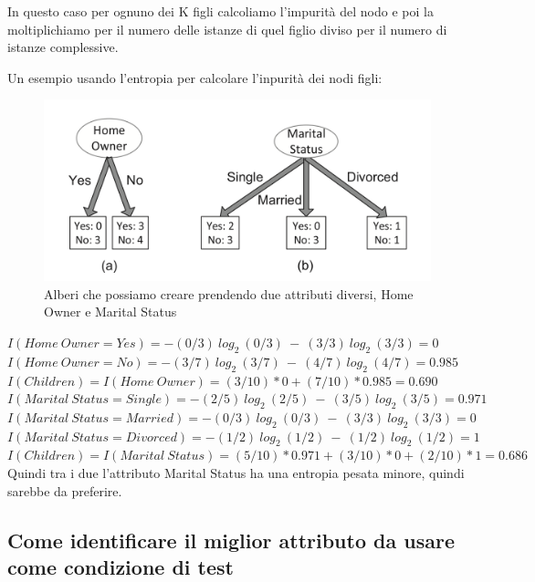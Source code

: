 \documentclass[14pt]{extreport}
\begin{document}
In questo caso per ognuno dei K figli calcoliamo l'impurità del nodo e poi la moltiplichiamo per il numero delle istanze di quel figlio diviso per il numero di istanze complessive.

Un esempio usando l'entropia per calcolare l'inpurità dei nodi figli:


\begin{figure}[H]
  \centering\includegraphics[width=\linewidth]{TestCondition1.png}
  \caption{Alberi che possiamo creare prendendo due attributi diversi, Home Owner e Marital Status}
\end{figure}
\newline\newline$I(Home\ Owner = Yes) = - (0/3)\ log_2\ (0/3)\ -\ (3/3)\ log_2\ (3/3) = 0$
\newline
$I(Home\ Owner = No) =  - (3/7)\ log_2\ (3/7)\ -\ (4/7)\ log_2\ (4/7) = 0.985 $ \newline
$I(Children) = I(Home\ Owner) = (3/10) * 0 + (7/10) * 0.985 = 0.690
$  \newline\newline$I(Marital \ Status = Single) =- (2/5)\ log_2\ (2/5)\ -\ (3/5)\ log_2\ (3/5) = 0.971$  \newline
    $I(Marital \ Status = Married) = - (0/3)\ log_2\ (0/3)\ -\ (3/3)\ log_2\ (3/3) = 0$ \newline
    $I(Marital \ Status = Divorced) = - (1/2)\ log_2\ (1/2)\ -\ (1/2)\ log_2\ (1/2) = 1$ \newline
    $I(Children) = I(Marital \ Status) = (5/10) * 0.971 + (3/10) * 0 + (2/10) * 1 = 0.686$
\newline
\newline
Quindi tra i due l'attributo Marital Status ha una entropia pesata minore, quindi sarebbe da preferire.

    
\subsection{Come identificare il miglior attributo da usare come condizione di test}
\end{document}
